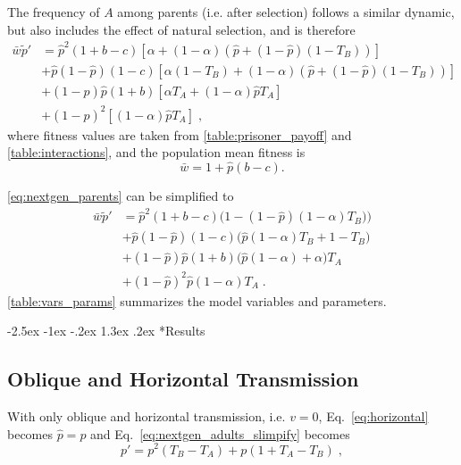 \documentclass[12pt]{extarticle}
\makeatletter
\renewcommand\section{\@startsection {section}{1}{\z@}%
     {-2.5ex \@plus -1ex \@minus -.2ex}%
     {1.3ex \@plus.2ex}%
    {\Large\bfseries}}
\makeatother
\begin{document}
The frequency of $A$ among parents (i.e. after selection) follows a similar dynamic, but also includes the effect of natural selection, and is therefore
\begin{equation}\label{eq:nextgen_parents}
\begin{aligned}
\bar{w} \tilde{p}'
& = \hat{p}^2 (1+b-c) [\alpha + (1-\alpha)(\hat{p} + (1-\hat{p})(1-T_B))] \\
& + \hat{p}(1-\hat{p}) (1-c) [\alpha(1-T_B) + (1-\alpha)(\hat{p} + (1-\hat{p})(1-T_B))] \\
& + (1-\hat{p})\hat{p} (1+b) [\alpha T_A + (1-\alpha) \hat{p} T_A ] \\
& + (1-\hat{p})^2 [(1-\alpha) \hat{p} T_A] \;,
\end{aligned}
\end{equation}
where fitness values are taken from \autoref{table:prisoner_payoff} and \autoref{table:interactions}, and the population mean fitness is
\begin{equation} \label{eq:mean_fitness}
\bar{w} =  1 + \hat{p}(b-c).
\end{equation}

\autoref{eq:nextgen_parents} can be simplified to
\begin{equation}\label{eq:nextgen_parents_simplified}
\begin{aligned}
\bar{w} \tilde{p}'
& = \hat{p}^2 (1+b-c) \big(1-(1-\hat{p})(1-\alpha)T_B)\big) \\
& + \hat{p}(1-\hat{p}) (1-c) \big(\hat{p}(1-\alpha)T_B+1-T_B\big) \\
& + (1-\hat{p})\hat{p} (1+b) \big(\hat{p}(1-\alpha) + \alpha\big) T_A \\
& + (1-\hat{p})^2 \hat{p} (1-\alpha) T_A \;.
\end{aligned}
\end{equation}
\autoref{table:vars_params} summarizes the model variables and parameters.


\section*{Results}


\subsection*{Oblique and Horizontal Transmission}

With only oblique and horizontal transmission, i.e. $v = 0$, Eq.\ \ref{eq:horizontal} becomes $\hat{p}=p$ and Eq.\ \ref{eq:nextgen_adults_slimpify} becomes 
\begin{equation}  \label{eq:nextgen_parents_oblique_only}
p' = p^2 (T_B-T_A) + p (1+T_A-T_B) \;,
\end{equation}
\end{document}
